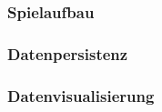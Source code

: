 \documentclass[10pt, a4paper, oneside, titlepage]{scrartcl} %
\begin{document}
	\subsubsection{Spielaufbau}
	
	
	\subsubsection{Datenpersistenz}
	
	
	\subsubsection{Datenvisualisierung}
   	
   	
\label{letzte_seite} %
\end{document}

